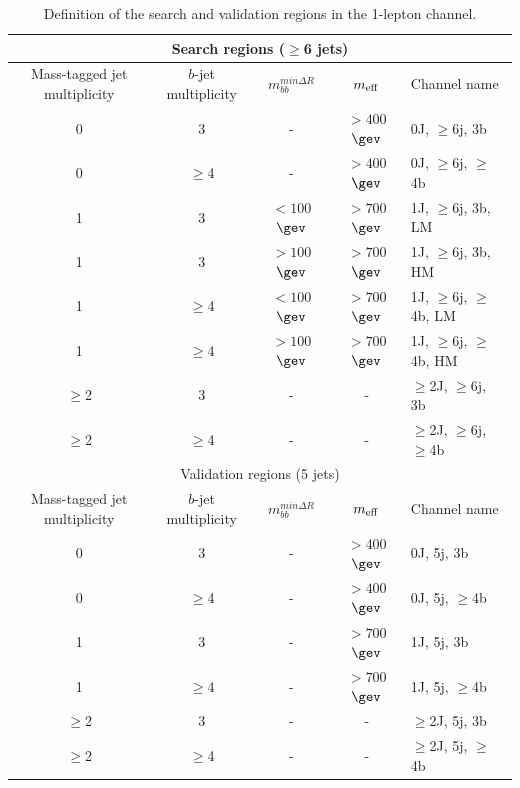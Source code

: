 \begin{table}[t!]\footnotesize
\begin{center}
\begin{tabular}{cccc l}
\toprule\toprule
\multicolumn{5}{c}{Search regions ($\geq$6 jets)} \\     
\midrule
Mass-tagged jet multiplicity & $b$-jet multiplicity  & $m_{bb}^{min\Delta R}$ & $m_{\rm eff}$  & Channel name \\
\midrule
0 & 3 & - & $>400$ $\gev$ & 0J, $\geq$6j, 3b \\
0 & $\geq$4 & - & $>400$ $\gev$ & 0J, $\geq$6j, $\geq$4b \\     
1 & 3 & $<100$ $\gev$ & $>700$ $\gev$ & 1J, $\geq$6j, 3b, LM \\
1 & 3 & $>100$ $\gev$ & $>700$ $\gev$ & 1J, $\geq$6j, 3b, HM \\
1 & $\geq$4 & $<100$ $\gev$ & $>700$ $\gev$ & 1J, $\geq$6j, $\geq$4b, LM \\ 
1 & $\geq$4 & $>100$ $\gev$ & $>700$ $\gev$ & 1J, $\geq$6j, $\geq$4b, HM \\         
$\geq$2 & 3 & - & - & $\geq$2J, $\geq$6j, 3b \\
$\geq$2 & $\geq$4 & - & - & $\geq$2J, $\geq$6j, $\geq$4b \\     
\midrule\midrule
\multicolumn{5}{c}{Validation regions (5 jets)} \\     
\midrule
Mass-tagged jet multiplicity & $b$-jet multiplicity  & $m_{bb}^{min\Delta R}$ & $m_{\rm eff}$ & Channel name \\
\midrule
0 & 3 & - & $>400$ $\gev$ & 0J, 5j, 3b \\
0 & $\geq$4 & - & $>400$ $\gev$ & 0J, 5j, $\geq$4b \\     
1 & 3 & - & $>700$ $\gev$ & 1J, 5j, 3b \\
1 & $\geq$4 & - & $>700$ $\gev$ & 1J, 5j, $\geq$4b \\         
$\geq$2 & 3 & - & - & $\geq$2J, 5j, 3b \\
$\geq$2 & $\geq$4 & - & - & $\geq$2J, 5j, $\geq$4b \\     
\bottomrule\bottomrule
\end{tabular}
\captionsetup{width=0.85\textwidth} \caption{\small{Definition of the search and validation regions in the 1-lepton channel.}}
\label{tab:VLQ:fit:channels1L}
\end{center}
\end{table}

